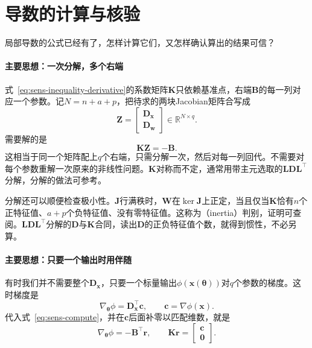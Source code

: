 \section{导数的计算与核验}
\label{sec:sens-computation}

局部导数的公式已经有了，怎样计算它们，又怎样确认算出的结果可信？

\paragraph{主要思想：一次分解，多个右端}
式~\eqref{eq:sens-inequality-derivative}的系数矩阵$\bm{K}$只依赖基准点，右端$\bm{B}$的每一列对应一个参数。记$N=n+a+p$，把待求的两块Jacobian矩阵合写成
\[
 \bm{Z}=\begin{bmatrix}\bm{D}_{\bm{x}}\\\bm{D}_{\bm{w}}\end{bmatrix}\in\mathbb{R}^{N\times q}.
\]
需要解的是
\begin{equation}
 \bm{K}\bm{Z}=-\bm{B}.
 \label{eq:sens-compute}
\end{equation}
这相当于同一个矩阵配上$q$个右端，只需分解一次，然后对每一列回代。不需要对每个参数重解一次原来的非线性问题。$\bm{K}$对称而不定，通常用带主元选取的$\bm{L}\bm{D}\bm{L}^{\top}$分解，分解的做法可参考。

分解还可以顺便检查极小性。$\bm{J}$行满秩时，$\bm{W}$在$\ker\bm{J}$上正定，当且仅当$\bm{K}$恰有$n$个正特征值、$a+p$个负特征值、没有零特征值。这称为（inertia）判别，证明可查阅。$\bm{L}\bm{D}\bm{L}^{\top}$分解的$\bm{D}$与$\bm{K}$合同，读出$\bm{D}$的正负特征值个数，就得到惯性，不必另算。

\paragraph{主要思想：只要一个输出时用伴随}
有时我们并不需要整个$\bm{D}_{\bm{x}}$，只要一个标量输出$\phi(\bm{x}(\bm{\theta}))$对$q$个参数的梯度。这时梯度是
\[
 \nabla_{\bm{\theta}}\phi=\bm{D}_{\bm{x}}^{\top}\bm{c},\qquad\bm{c}=\nabla\phi(\bm{x}).
\]
代入式~\eqref{eq:sens-compute}，并在$\bm{c}$后面补零以匹配维数，就是
\begin{equation}
 \nabla_{\bm{\theta}}\phi=-\bm{B}^{\top}\bm{r},\qquad
 \bm{K}\bm{r}=\begin{bmatrix}\bm{c}\\\bm{0}\end{bmatrix}.
 \label{eq:sens-adjoint}
\end{equation}

